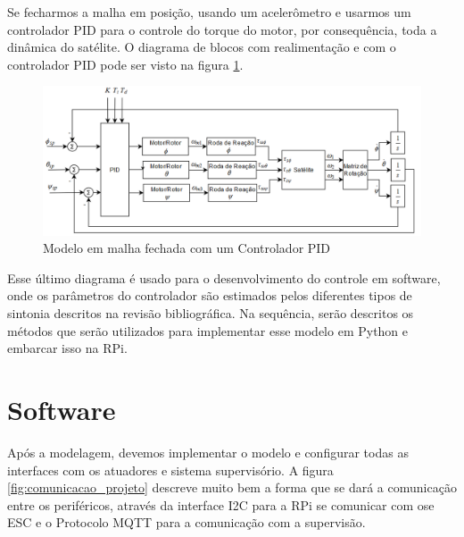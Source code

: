 Se fecharmos a malha em posição, usando um acelerômetro e usarmos um controlador PID para o controle do torque do motor, por consequência, toda a dinâmica do satélite. O diagrama de blocos com realimentação e com o controlador PID pode ser visto na figura \ref{fig:modelo_satelite_pid}. 

\begin{figure}[H]
  \caption{Modelo em malha fechada com um Controlador PID}
  \begin{center}
      \includegraphics[scale=.58]{img/modelo_satelite_pid}
  \end{center}
  \label{fig:modelo_satelite_pid}
\end{figure}

Esse último diagrama é usado para o desenvolvimento do controle em software, onde os parâmetros do controlador são estimados pelos diferentes tipos de sintonia descritos na revisão bibliográfica. Na sequência, serão descritos os métodos que serão utilizados para implementar esse modelo em Python e embarcar isso na RPi.


\section{Software}

Após a modelagem, devemos implementar o modelo e configurar todas as interfaces com os atuadores e sistema supervisório. A figura \ref{fig:comunicacao_projeto} descreve muito bem a forma que se dará a comunicação entre os periféricos, através da interface I2C para a RPi se comunicar com ose ESC e o Protocolo MQTT para a comunicação com a supervisão.


